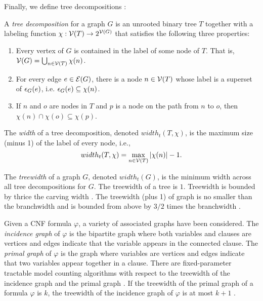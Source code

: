 Finally, we define tree decompositions \cite{RS91}:
\begin{definition}
\label{def:treedecomposition}
	A \emph{tree decomposition} for a graph $G$ is an unrooted binary tree $T$ together with a labeling function $\chi : \mathcal{V}(T) \rightarrow 2^{\mathcal{V}(G)}$ that satisfies the following three properties:
	\begin{enumerate}
		\item Every vertex of $G$ is contained in the label of some node of $T$. That is, $\mathcal{V}(G) = \bigcup_{n \in \mathcal{V}(T)} \chi(n)$.
		\item For every edge $e \in \mathcal{E}(G)$, there is a node $n \in \mathcal{V}(T)$ whose label is a superset of $\epsilon_{G}(e)$, i.e. $\epsilon_{G}(e) \subseteq \chi(n)$.
		\item If $n$ and $o$ are nodes in $T$ and $p$ is a node on the path from $n$ to $o$, then $\chi(n) \cap \chi(o) \subseteq \chi(p)$.
	\end{enumerate}
	The \emph{width} of a tree decomposition, denoted $width_t(T, \chi)$, is the maximum size (minus 1) of the label of every node, i.e.,
	$$width_t(T, \chi) = \max_{n \in \mathcal{V}(T)} | \chi(n) | - 1.$$
\end{definition}

The \emph{treewidth} of a graph $G$, denoted $width_t(G)$, is the minimum width across all tree decompositions for $G$. The treewidth of a tree is $1$. Treewidth is bounded by thrice the carving width \cite{sasak10}. The treewidth (plus 1) of graph is no smaller than the branchwidth and is bounded from above by $3/2$ times the branchwidth \cite{RS91}. 

Given a CNF formula $\varphi$, a variety of associated graphs have been considered. The \emph{incidence graph} of $\varphi$ is the bipartite graph where both variables and clauses are vertices and edges indicate that the variable appears in the connected clause. The \emph{primal graph} of $\varphi$ is the graph where variables are vertices and edges indicate that two variables appear together in a clause. There are fixed-parameter tractable model counting algorithms with respect to the treewidth of the incidence graph and the primal graph \cite{SS10}. If the treewidth of the primal graph of a formula $\varphi$ is $k$, the treewidth of the incidence graph of $\varphi$ is at most $k+1$ \cite{KV00}.
